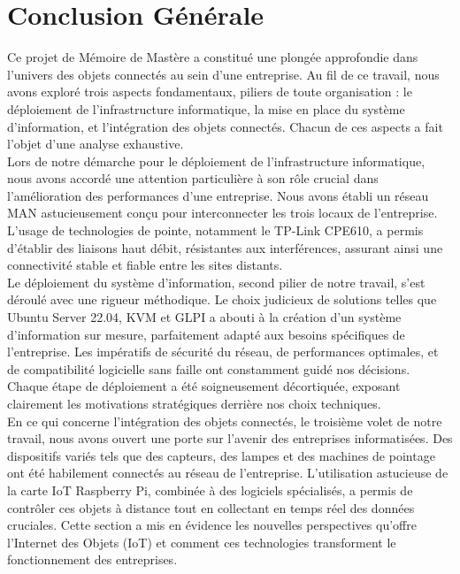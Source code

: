 \chapter*{Conclusion Générale}

{\fontsize{16pt}{20pt}\selectfont

Ce projet de Mémoire de Mastère a constitué une plongée approfondie dans l'univers des objets connectés au sein d'une entreprise. Au fil de ce travail, nous avons exploré trois aspects fondamentaux, piliers de toute organisation : le déploiement de l'infrastructure informatique, la mise en place du système d'information, et l'intégration des objets connectés. Chacun de ces aspects a fait l'objet d'une analyse exhaustive. \\

Lors de notre démarche pour le déploiement de l'infrastructure informatique, nous avons accordé une attention particulière à son rôle crucial dans l'amélioration des performances d'une entreprise. Nous avons établi un réseau MAN astucieusement conçu pour interconnecter les trois locaux de l'entreprise. L'usage de technologies de pointe, notamment le TP-Link CPE610, a permis d'établir des liaisons haut débit, résistantes aux interférences, assurant ainsi une connectivité stable et fiable entre les sites distants. \\

Le déploiement du système d'information, second pilier de notre travail, s'est déroulé avec une rigueur méthodique. Le choix judicieux de solutions telles que Ubuntu Server 22.04, KVM et GLPI a abouti à la création d'un système d'information sur mesure, parfaitement adapté aux besoins spécifiques de l'entreprise. Les impératifs de sécurité du réseau, de performances optimales, et de compatibilité logicielle sans faille ont constamment guidé nos décisions. Chaque étape de déploiement a été soigneusement décortiquée, exposant clairement les motivations stratégiques derrière nos choix techniques. \\

En ce qui concerne l'intégration des objets connectés, le troisième volet de notre travail, nous avons ouvert une porte sur l'avenir des entreprises informatisées. Des dispositifs variés tels que des capteurs, des lampes et des machines de pointage ont été habilement connectés au réseau de l'entreprise. L'utilisation astucieuse de la carte IoT Raspberry Pi, combinée à des logiciels spécialisés, a permis de contrôler ces objets à distance tout en collectant en temps réel des données cruciales. Cette section a mis en évidence les nouvelles perspectives qu'offre l'Internet des Objets (IoT) et comment ces technologies transforment le fonctionnement des entreprises. \\

}

